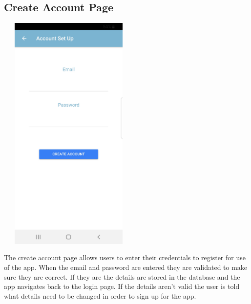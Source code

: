 \subsection{Create Account Page}
\begin{center}    
	\includegraphics[width=7cm, height=12cm]{img/createaccount.jpg}
\end{center}
The create account page allows users to enter their credentials to register for use of the app. When the email and password are entered they are validated to make sure they are correct. If they are the details are stored in the database and the app navigates back to the login page. If the details aren’t valid the user is told what details need to be changed in order to sign up for the app.
